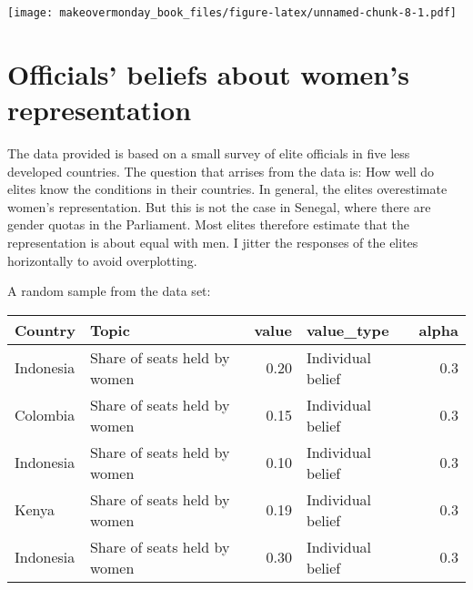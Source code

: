 \documentclass[]{book}
\theoremstyle{definition}
\theoremstyle{definition}
\theoremstyle{definition}
\theoremstyle{remark}
\begin{document}
\texttt{[image: makeovermonday\_book\_files/figure-latex/unnamed-chunk-8-1.pdf]}

\chapter{Officials' beliefs about women's
representation}\label{officials-beliefs-about-womens-representation}

The data provided is based on a small survey of elite officials in five
less developed countries. The question that arrises from the data is:
How well do elites know the conditions in their countries. In general,
the elites overestimate women's representation. But this is not the case
in Senegal, where there are gender quotas in the Parliament. Most elites
therefore estimate that the representation is about equal with men. I
jitter the responses of the elites horizontally to avoid overplotting.

A random sample from the data set:

\begin{tabular}{l|l|r|l|r}
\hline
Country & Topic & value & value\_type & alpha\\
\hline
Indonesia & Share of seats held by women & 0.20 & Individual belief & 0.3\\
\hline
Colombia & Share of seats held by women & 0.15 & Individual belief & 0.3\\
\hline
Indonesia & Share of seats held by women & 0.10 & Individual belief & 0.3\\
\hline
Kenya & Share of seats held by women & 0.19 & Individual belief & 0.3\\
\hline
Indonesia & Share of seats held by women & 0.30 & Individual belief & 0.3\\
\hline
\end{tabular}
\end{document}
